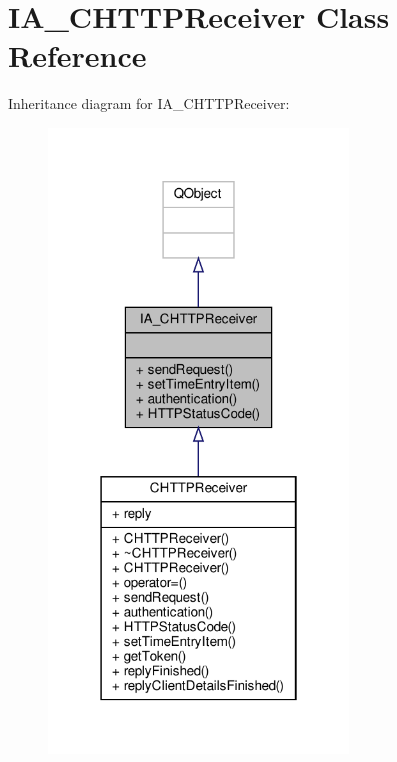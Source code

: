 \hypertarget{classIA__CHTTPReceiver}{}\section{I\+A\+\_\+\+C\+H\+T\+T\+P\+Receiver Class Reference}
\label{classIA__CHTTPReceiver}


Inheritance diagram for I\+A\+\_\+\+C\+H\+T\+T\+P\+Receiver\+:
\nopagebreak
\begin{figure}[H]
\begin{center}
\leavevmode
\includegraphics[width=226pt]{classIA__CHTTPReceiver__inherit__graph}
\end{center}
\end{figure}


